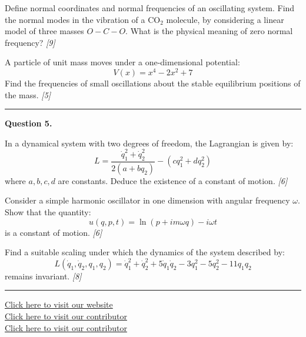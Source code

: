 \documentclass[11pt,a4paper]{article}
\newcommand{\pts}[1]{\hfill   \textit{[#1]}}
\begin{document}
\begin{parts}
  \item Define normal coordinates and normal frequencies of an oscillating system. Find the normal modes in the vibration of a CO$_2$ molecule, by considering a linear model of three masses $O - C - O$. What is the physical meaning of zero normal frequency? \pts{9}
  \item A particle of unit mass moves under a one-dimensional potential:
    \[ V(x) = x^4 - 2x^2 + 7 \]
    Find the frequencies of small oscillations about the stable equilibrium positions of the mass. \pts{5}
\end{parts}

\medskip\rule{\linewidth}{0.2pt}




\noindent   \textbf{Question 5.}

\begin{parts}
  \item In a dynamical system with two degrees of freedom, the Lagrangian is given by:
    \[ L = \frac{\dot{q}_1^2 + \dot{q}_2^2}{2 (a + b q_2)} - (c q_1^2 + d q_2^2) \]
    where $a, b, c, d$ are constants. Deduce the existence of a constant of motion. \pts{6}
  \item Consider a simple harmonic oscillator in one dimension with angular frequency $\omega$. Show that the quantity:
    \[ u(q, p, t) = \ln(p + i m\omega q) - i \omega t \]
    is a constant of motion. \pts{6}
  \item Find a suitable scaling under which the dynamics of the system described by:
    \[ L(\dot{q}_1, \dot{q}_2, q_1, q_2) = \dot{q}_1^2 + \dot{q}_2^2 + 5\dot{q}_1\dot{q}_2 - 3q_1^2 - 5q_2^2 - 11q_1 q_2 \]
    remains invariant. \pts{8}
\end{parts}

\vfill
\rule{\linewidth}{0.4pt}

\begin{center}\small
  \href{https://bhu-exam.vercel.app/}{Click here to visit our website}\\[4pt]
  \href{https://me-aryan.vercel.app/}{Click here to visit our contributor}\\[4pt]
  \href{https://quashan-me.vercel.app/}{Click here to visit our contributor}
\end{center}
\end{document}

